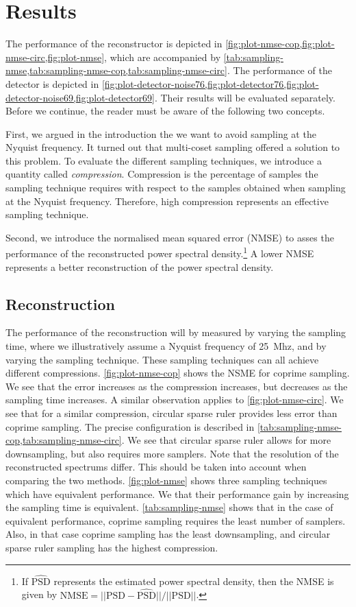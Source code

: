 \documentclass[a4paper, openany, oneside]{memoir}
\begin{document}
\section{Results}
The performance of the reconstructor is depicted in \cref{fig:plot-nmse-cop,fig:plot-nmse-circ,fig:plot-nmse}, which are accompanied by \cref{tab:sampling-nmse,tab:sampling-nmse-cop,tab:sampling-nmse-circ}. The performance of the detector is depicted in \cref{fig:plot-detector-noise76,fig:plot-detector76,fig:plot-detector-noise69,fig:plot-detector69}. Their results will be evaluated separately. Before we continue, the reader must be aware of the following two concepts.

First, we argued in the introduction the we want to avoid sampling at the Nyquist frequency. It turned out that multi-coset sampling offered a solution to this problem. To evaluate the different sampling techniques, we introduce a quantity called \textit{compression}. Compression is the percentage of samples the sampling technique requires with respect to the samples obtained when sampling at the Nyquist frequency. Therefore, high compression represents an effective sampling technique.

Second, we introduce the normalised mean squared error (NMSE) to asses the performance of the reconstructed power spectral density.\footnote{If $\hat{\text{PSD}}$ represents the estimated power spectral density, then the NMSE is given by $\text{NMSE} = ||\text{PSD} - \hat{\text{PSD}}||/||\text{PSD}||$.} A lower NMSE represents a better reconstruction of the power spectral density.

\subsection{Reconstruction}
The performance of the reconstruction will by measured by varying the sampling time, where we illustratively assume a Nyquist frequency of \SI{25}{Mhz}, and by varying the sampling technique. These sampling techniques can all achieve different compressions. \cref{fig:plot-nmse-cop} shows the NSME for coprime sampling. We see that the error increases as the compression increases, but decreases as the sampling time increases. A similar observation applies to \cref{fig:plot-nmse-circ}. We see that for a similar compression, circular sparse ruler provides less error than coprime sampling. The precise configuration is described in \cref{tab:sampling-nmse-cop,tab:sampling-nmse-circ}. We see that circular sparse ruler allows for more downsampling, but also requires more samplers. Note that the resolution of the reconstructed spectrums differ. This should be taken into account when comparing the two methods. \cref{fig:plot-nmse} shows three sampling techniques which have equivalent performance. We that their performance gain by increasing the sampling time is equivalent. \cref{tab:sampling-nmse} shows that in the case of equivalent performance, coprime sampling requires the least number of samplers. Also, in that case coprime sampling has the least downsampling, and circular sparse ruler sampling has the highest compression.
\end{document}
